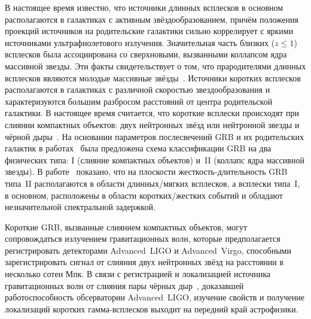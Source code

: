 В настоящее время известно, что источники длинных всплесков в основном располагаются в галактиках 
с активным звёздообразованием, причём положения проекций источников на родительские галактики сильно
коррелирует с яркими источниками ультрафиолетового излучения. Значительная часть 
близких ($z \le 1$) всплесков была ассоциирована со сверхновыми, вызванными 
коллапсом ядра массивной звезды.
Эти факты свидетельствует о том, что прародителями длинных всплесков являются молодые 
массивные звёзды~\citep{Berger_2014ARAA}.
Источники коротких всплесков располагаются в галактиках с различной скоростью 
звездообразования и характеризуются большим разбросом расстояний от центра родительской галактики. 
В настоящее время считается, что короткие всплески происходят при слиянии компактных 
объектов: двух нейтронных звёзд или нейтронной звезды и чёрной дыры~\citep{Berger_2014ARAA}.
На основании параметров послесвечений GRB и их родительских галактик в 
работах~\citep{Zhang_2006,Zhang_2009} была предложена 
схема классификации GRB на два физических типа: I (слияние компактных объектов) 
и~II (коллапс ядра массивной звезды). В работе~\citep{Zhang_2009} показано,
что на плоскости жесткость-длительность GRB типа~II располагаются в области 
длинных/мягких всплесков, а всплески типа~I, в основном, расположены в области коротких/жестких 
событий и обладают незначительной спектральной задержкой.

Короткие GRB, вызванные слиянием компактных объектов, могут сопровождаться 
излучением гравитационных волн, которые предполагается регистрировать 
детекторами Advanced~LIGO и Advanced~Virgo, 
способными зарегистрировать сигнал от слияния двух нейтронных звёзд на расстоянии в несколько сотен Мпк. 
В связи с регистрацией и локализацией источника гравитационных
волн от слияния пары чёрных дыр~\citep{Abbott_2016PhRvL}, доказавшей работоспособность обсерватории 
Advanced~LIGO, изучение свойств и получение локализаций коротких гамма-всплесков 
выходит на передний край астрофизики.

